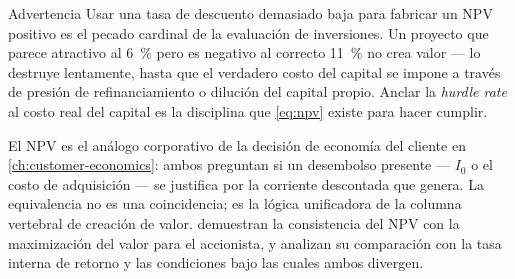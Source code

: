 \begin{admonition}{Advertencia}
Usar una tasa de descuento demasiado baja para fabricar un NPV positivo es el pecado cardinal
de la evaluación de inversiones. Un proyecto que parece atractivo al \qty{6}{\percent} pero es
negativo al correcto \qty{11}{\percent} no crea valor --- lo destruye lentamente, hasta que el
verdadero costo del capital se impone a través de presión de refinanciamiento o dilución del
capital propio. Anclar la \emph{hurdle rate} al costo real del capital es la disciplina que
\cref{eq:npv} existe para hacer cumplir.
\end{admonition}

El NPV es el análogo corporativo de la decisión de economía del cliente en
\cref{ch:customer-economics}: ambos preguntan si un desembolso presente --- \(I_0\) o el costo
de adquisición --- se justifica por la corriente descontada que genera. La equivalencia no es
una coincidencia; es la lógica unificadora de la columna vertebral de creación de valor.
\textcite{brealey2020} demuestran la consistencia del NPV con la maximización del valor para
el accionista, y \textcite{ross2022} analizan su comparación con la tasa interna de retorno y
las condiciones bajo las cuales ambos divergen.
